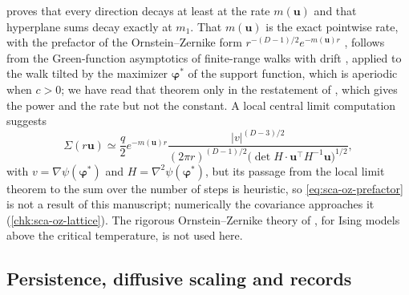 \begin{remark}\label{rem:sca-oz-form}
 proves that every direction decays at least at the rate $m(\mathbf u)$ and that hyperplane sums decay exactly at $m_1$. That $m(\mathbf u)$ is the exact pointwise rate, with the prefactor of the Ornstein--Zernike form $r^{-(D-1)/2}e^{-m(\mathbf u)r}$ \citep{ornstein1914accidental}, follows from the Green-function asymptotics of finite-range walks with drift \citep{ney1966martin}, applied to the walk tilted by the maximizer $\boldsymbol\varphi^\ast$ of the support function, which is aperiodic when $c>0$; we have read that theorem only in the restatement of \citet{ballu2024asymptotics}, which gives the power and the rate but not the constant. A local central limit computation suggests
\begin{equation}\label{eq:sca-oz-prefactor}
\Sigma(r\mathbf u)\simeq\frac q2e^{-m(\mathbf u)r}\frac{|v|^{(D-3)/2}}{(2\pi r)^{(D-1)/2}\bigl(\det H\cdot\mathbf u^\top H^{-1}\mathbf u\bigr)^{1/2}},
\end{equation}
with $v=\nabla\psi(\boldsymbol\varphi^\ast)$ and $H=\nabla^2\psi(\boldsymbol\varphi^\ast)$, but its passage from the local limit theorem to the sum over the number of steps is heuristic, so \eqref{eq:sca-oz-prefactor} is not a result of this manuscript; numerically the covariance approaches it (\cref{chk:sca-oz-lattice}). The rigorous Ornstein--Zernike theory of \citet{campanino2003ornstein}, for Ising models above the critical temperature, is not used here.
\end{remark}

\subsection{Persistence, diffusive scaling and records}\label{sup:sca-persistence-diffusive-scaling-and-record}

